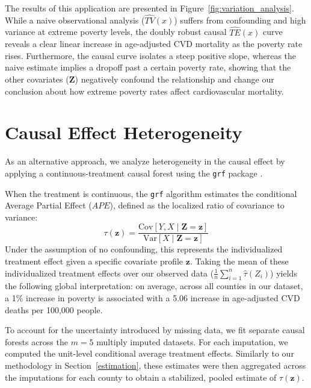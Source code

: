 \documentclass{article}
\theoremstyle{plain}
\theoremstyle{definition}
\theoremstyle{remark}
\begin{document}
The results of this application are presented in 
Figure~\ref{fig:variation_analysis}. While a naive observational analysis 
($\widehat{TV}(x)$) suffers from confounding and high variance at extreme 
poverty levels, the doubly robust causal $\widehat{TE}(x)$ curve reveals a clear linear increase in age-adjusted 
CVD mortality as the poverty rate rises. Furthermore, the causal curve isolates 
a steep positive slope, whereas the naive estimate implies a dropoff past a certain poverty rate, 
showing that the other covariates ($\mathbf{Z}$) negatively confound the 
relationship and change our conclusion about how extreme 
poverty rates affect cardiovascular mortality.



 

\section{Causal Effect Heterogeneity}
\label{heterogeneity}
As an alternative approach, we analyze heterogeneity in the causal effect by applying a 
continuous-treatment causal forest using the \texttt{grf} package \citep{grf}. 

When the treatment is continuous, the \texttt{grf} algorithm estimates the 
conditional Average Partial Effect ($APE$), defined as the localized ratio of 
covariance to variance:
$$\tau(\mathbf{z}) = \frac{\text{Cov}[Y, X \mid \mathbf{Z} = \mathbf{z}]}{\text{Var}[X \mid \mathbf{Z} = \mathbf{z}]}$$
Under the assumption of no confounding, this represents the individualized 
treatment effect given a specific covariate profile $\mathbf{z}$. Taking the mean of these individualized treatment effects over our 
observed data ($\frac{1}{n}\sum_{i=1}^n \hat \tau(Z_i)$) yields the following global interpretation: on average, across 
all counties in our dataset, a 1\% increase in poverty is associated with a 
5.06 increase in age-adjusted CVD deaths per 100,000 people.

To account for the uncertainty introduced by missing data, we fit 
separate causal forests across the $m=5$ multiply imputed datasets. For each 
imputation, we computed the unit-level conditional average treatment effects. Similarly to our methodology in Section~\ref{estimation}, these estimates were then aggregated across the imputations for each 
county to obtain a stabilized, pooled estimate of $\tau(\mathbf{z})$.
\end{document}
